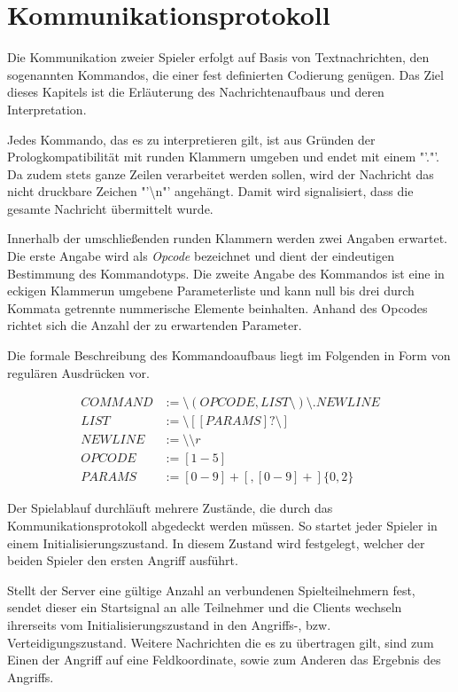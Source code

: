 \section{Kommunikationsprotokoll}
\label{sec:Kommunikationsmodell}

Die Kommunikation zweier Spieler erfolgt auf Basis von Textnachrichten, den sogenannten Kommandos, die einer fest definierten Codierung genügen.
Das Ziel dieses Kapitels ist die Erläuterung des Nachrichtenaufbaus und deren Interpretation.

Jedes Kommando, das es zu interpretieren gilt, ist aus Gründen der Prologkompatibilität mit runden Klammern umgeben und endet mit einem "'."'.
Da zudem stets ganze Zeilen verarbeitet werden sollen, wird der Nachricht das nicht druckbare Zeichen "'\textbackslash n"' angehängt.
Damit wird signalisiert, dass die gesamte Nachricht übermittelt wurde.

Innerhalb der umschließenden runden Klammern werden zwei Angaben erwartet.
Die erste Angabe wird als \emph{Opcode} bezeichnet und dient der eindeutigen Bestimmung des Kommandotyps.
Die zweite Angabe des Kommandos ist eine in eckigen Klammerun umgebene Parameterliste und kann null bis drei durch Kommata getrennte nummerische Elemente beinhalten.
Anhand des Opcodes richtet sich die Anzahl der zu erwartenden Parameter.

Die formale Beschreibung des Kommandoaufbaus liegt im Folgenden in Form von regulären Ausdrücken vor.

\begin{align*}
	COMMAND &:= \text{\textbackslash}(OPCODE,LIST\text{\textbackslash}) \text{\textbackslash}. NEWLINE \\
	LIST &:= \text{\textbackslash}[ [PARAMS]? \text{\textbackslash}] \\
	NEWLINE &:= \text{\textbackslash \textbackslash} r \\
	OPCODE &:= [1-5] \\
	PARAMS &:= [0-9]+[,[0-9]+]\{0,2\}
\end{align*}

Der Spielablauf durchläuft mehrere Zustände, die durch das Kommunikationsprotokoll abgedeckt werden müssen.
So startet jeder Spieler in einem Initialisierungszustand.
In diesem Zustand wird festgelegt, welcher der beiden Spieler den ersten Angriff ausführt.

Stellt der Server eine gültige Anzahl an verbundenen Spielteilnehmern fest, sendet dieser ein Startsignal an alle Teilnehmer und die Clients wechseln ihrerseits vom Initialisierungszustand in den Angriffs-, bzw. Verteidigungszustand.
Weitere Nachrichten die es zu übertragen gilt, sind zum Einen der Angriff auf eine Feldkoordinate, sowie zum Anderen das Ergebnis des Angriffs.

